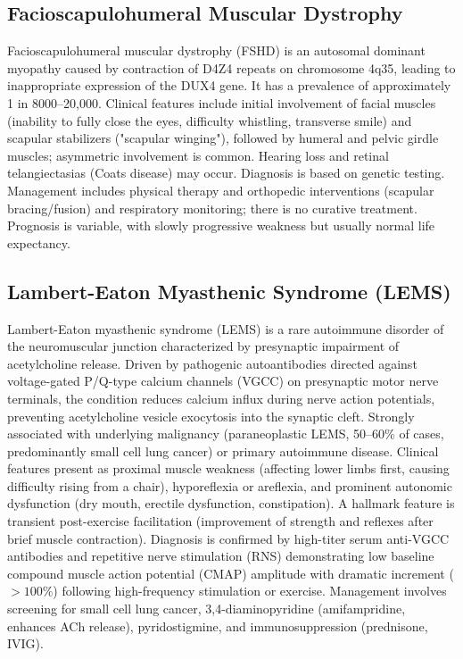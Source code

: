 \subsection{Facioscapulohumeral Muscular Dystrophy}
\label{sec:Facioscapulohumeral Muscular Dystrophy}
Facioscapulohumeral muscular dystrophy (FSHD) is an autosomal dominant myopathy caused by contraction of D4Z4 repeats on chromosome 4q35, leading to inappropriate expression of the DUX4 gene. It has a prevalence of approximately 1 in 8000--20,000. Clinical features include initial involvement of facial muscles (inability to fully close the eyes, difficulty whistling, transverse smile) and scapular stabilizers ("scapular winging"), followed by humeral and pelvic girdle muscles; asymmetric involvement is common. Hearing loss and retinal telangiectasias (Coats disease) may occur. Diagnosis is based on genetic testing. Management includes physical therapy and orthopedic interventions (scapular bracing/fusion) and respiratory monitoring; there is no curative treatment. Prognosis is variable, with slowly progressive weakness but usually normal life expectancy.

\subsection{Lambert-Eaton Myasthenic Syndrome (LEMS)}
\label{sec:Lambert-Eaton Myasthenic Syndrome (LEMS)}
Lambert-Eaton myasthenic syndrome (LEMS) is a rare autoimmune disorder of the neuromuscular junction characterized by presynaptic impairment of acetylcholine release. Driven by pathogenic autoantibodies directed against voltage-gated P/Q-type calcium channels (VGCC) on presynaptic motor nerve terminals, the condition reduces calcium influx during nerve action potentials, preventing acetylcholine vesicle exocytosis into the synaptic cleft. Strongly associated with underlying malignancy (paraneoplastic LEMS, 50--60\% of cases, predominantly small cell lung cancer) or primary autoimmune disease. Clinical features present as proximal muscle weakness (affecting lower limbs first, causing difficulty rising from a chair), hyporeflexia or areflexia, and prominent autonomic dysfunction (dry mouth, erectile dysfunction, constipation). A hallmark feature is transient post-exercise facilitation (improvement of strength and reflexes after brief muscle contraction). Diagnosis is confirmed by high-titer serum anti-VGCC antibodies and repetitive nerve stimulation (RNS) demonstrating low baseline compound muscle action potential (CMAP) amplitude with dramatic increment ($>100\%$) following high-frequency stimulation or exercise. Management involves screening for small cell lung cancer, 3,4-diaminopyridine (amifampridine, enhances ACh release), pyridostigmine, and immunosuppression (prednisone, IVIG).

